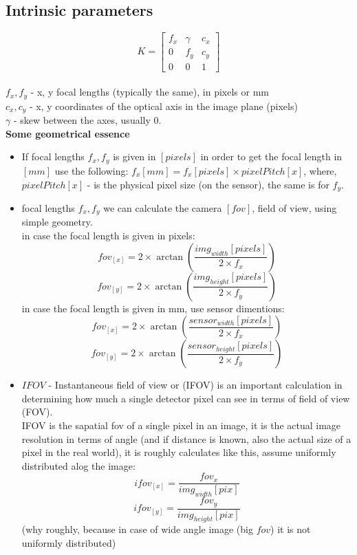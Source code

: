 \documentclass{article}
\begin{document}
\subsection{Intrinsic parameters}
$$K = \begin{bmatrix}
f_x & \gamma & c_x \\
0 & f_y & c_y \\
0 & 0 & 1
\end{bmatrix} $$\\
$f_x, f_y$ - x, y focal lengths (typically the same), in pixels or mm \\
$c_x, c_y$ - x, y coordinates of the optical axis in the image plane (pixels) \\
$\gamma$ - skew between the axes, usually 0.\\
\textbf{Some geometrical essence}
\begin{itemize}
	\item If focal lengths  $f_x, f_y$ is given in $\left[ pixels \right]$ in order to get the focal length in $\left[ mm \right]$ use the following: $f_x\left[ mm \right] = f_x\left[ pixels \right]\times pixelPitch[x]$, where, $pixelPitch[x]$ - is the physical pixel size (on the sensor), the same is for $f_y$.
	\item focal lengths  $f_x, f_y$  we can calculate the camera $\left[fov\right]$, field of view, using simple geometry.\\
	in case the focal length is given in pixels:
	$$fov_{[x]} = 2\times\arctan{\left(\frac{img_{width}\left[pixels\right]}{2\times f_x}\right)} $$
    $$fov_{[y]} = 2\times\arctan{\left(\frac{img_{height}\left[pixels\right]}{2\times f_y}\right)} $$
in case the focal length is given in mm, use sensor dimentions:
	$$fov_{[x]} = 2\times\arctan{\left(\frac{sensor_{width}\left[pixels\right]}{2\times f_x}\right)} $$
    $$fov_{[y]} = 2\times\arctan{\left(\frac{sensor_{height}\left[pixels\right]}{2\times f_y}\right)} $$   
    \item $IFOV$ - Instantaneous field of view or (IFOV) is an important calculation in determining how much a single detector pixel can see in terms of field of view (FOV).\\
    IFOV is the sapatial fov of a single pixel in an image, it is the actual image resolution in terms of angle (and if distance is known, also the actual size of a pixel in the real world), it is roughly  calculates like this, assume uniformly distributed alog the image:
    $$ifov_{[x]} = \frac{fov_x}{img_{width}[pix]} $$
    $$ifov_{[y]} = \frac{fov_y}{img_{height}[pix]} $$
    (why roughly, because in case of wide angle image (big $fov$) it is not uniformly distributed)

\end{itemize}
\end{document}
